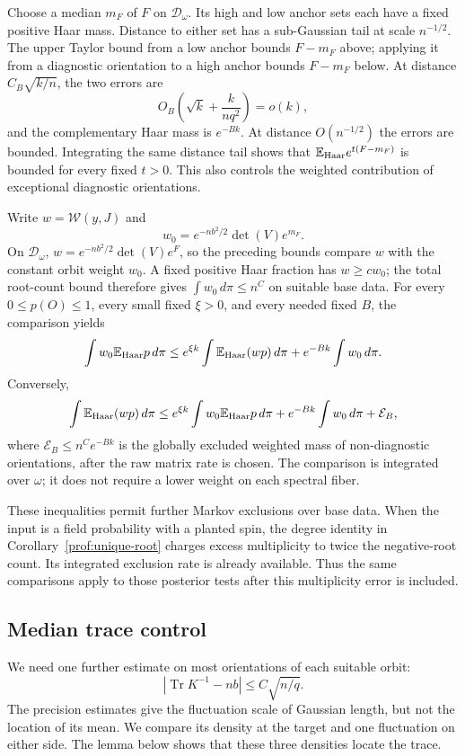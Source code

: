 Choose a median $m_F$ of $F$ on $\mathcal D_\omega$. Its high and low
anchor sets each have a fixed positive Haar mass. Distance to either
set has a sub-Gaussian tail at scale $n^{-1/2}$. The upper Taylor bound
from a low anchor bounds $F-m_F$ above; applying it from a diagnostic
orientation to a high anchor bounds $F-m_F$ below. At distance
$C_B\sqrt{k/n}$, the two errors are
\[
 O_B\left(\sqrt k+\frac{k}{nq^2}\right)=o(k),
\]
and the complementary Haar mass is $e^{-Bk}$. At distance $O(n^{-1/2})$
the errors are bounded. Integrating the same distance tail shows that
$\mathbb E_{\rm Haar}e^{t(F-m_F)}$ is bounded for every fixed $t>0$.
This also controls the weighted contribution of exceptional diagnostic
orientations.

Write $w=\mathcal W(y,J)$ and
\[
 w_0=e^{-nb^2/2}\det(V)e^{m_F}.
\]
On $\mathcal D_\omega$, $w=e^{-nb^2/2}\det(V)e^{F}$, so the preceding
bounds compare $w$ with the constant orbit weight $w_0$. A fixed
positive Haar fraction has $w\ge c w_0$; the total root-count bound
therefore gives $\int w_0\,d\pi\le n^C$ on suitable base data.
For every $0\le p(O)\le1$, every small fixed $\xi>0$, and every
needed fixed $B$, the comparison yields
\[
 \int w_0\mathbb E_{\rm Haar}p\,d\pi
 \le e^{\xi k}\int\mathbb E_{\rm Haar}(wp)\,d\pi
       +e^{-Bk}\int w_0\,d\pi.
\]
Conversely,
\[
 \int\mathbb E_{\rm Haar}(wp)\,d\pi
 \le e^{\xi k}\int w_0\mathbb E_{\rm Haar}p\,d\pi
       +e^{-Bk}\int w_0\,d\pi+\mathcal E_B,
\]
where $\mathcal E_B\le n^Ce^{-Bk}$ is the globally excluded weighted
mass of non-diagnostic orientations, after the raw matrix rate is
chosen. The comparison is integrated
over $\omega$; it does not require a lower weight on each spectral
fiber.

These inequalities permit further Markov exclusions over base data.
When the input is a field probability with a planted spin, the degree
identity in Corollary~\ref{prof:unique-root} charges excess multiplicity
to twice the negative-root count. Its integrated exclusion rate is
already available. Thus the same comparisons apply to those posterior
tests after this multiplicity error is included.

\subsection{Median trace control}

We need one further estimate on most orientations of each suitable
orbit:
\begin{equation}\label{prof:eq12}
 |\operatorname{Tr}K^{-1}-nb|\le C\sqrt{n/q}.
\end{equation}
The precision estimates give the fluctuation scale of Gaussian length,
but not the location of its mean. We compare its density at the target
and one fluctuation on either side. The lemma below shows that these
three densities locate the trace.

